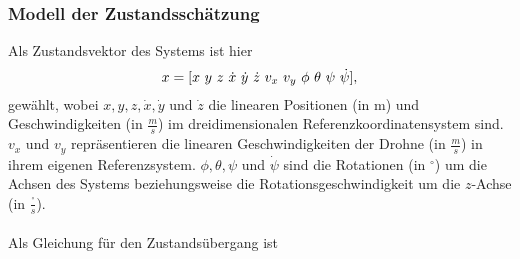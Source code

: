 \subsubsection{Modell der Zustandsschätzung}\label{zustandsschätzung}
Als Zustandsvektor des Systems ist hier 
\begin{equation}
x = [x \\\ y \\\ z \\\ \dot{x} \\\ \dot{y} \\\ \dot{z} \\\ v_x \\\ v_y \\\ \phi \\\ \theta \\\ \psi \\\ \dot{\psi}], 
\end{equation}
gewählt, wobei $x, y, z, \dot{x}, \dot{y}$ und $\dot{z}$ die linearen Positionen (in \unit{m}) und Geschwindigkeiten (in $\unit{\frac{m}{s}}$) im dreidimensionalen Referenzkoordinatensystem sind. $v_x$ und $v_y$ repräsentieren die linearen Geschwindigkeiten  der Drohne (in $\unit{\frac{m}{s}}$) in ihrem eigenen Referenzsystem. 
$\phi, \theta, \psi$ und $\dot{\psi}$ sind die Rotationen (in $\unit{^\circ}$) um die Achsen des Systems beziehungsweise die Rotationsgeschwindigkeit um die $z$-Achse (in $\unit{\frac{^\circ}{s}}$).\\\\
Als Gleichung für den Zustandsübergang ist
